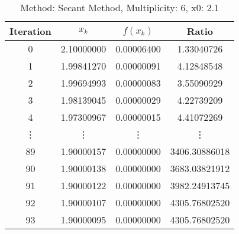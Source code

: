 \begin{table}
\centering
\caption{Method: Secant Method, Multiplicity: 6, x0: 2.1}
\label{tab:table_Secant_Method_6_2_1}
\begin{tabular}{c c c c}
\toprule
Iteration &      $x_k$ &   $f(x_k)$ &         Ratio \\
\midrule
        0 & 2.10000000 & 0.00006400 &    1.33040726 \\
        1 & 1.99841270 & 0.00000091 &    4.12848548 \\
        2 & 1.99694993 & 0.00000083 &    3.55090929 \\
        3 & 1.98139045 & 0.00000029 &    4.22739209 \\
        4 & 1.97300967 & 0.00000015 &    4.41072269 \\
   \vdots &     \vdots &     \vdots &        \vdots \\
       89 & 1.90000157 & 0.00000000 & 3406.30886018 \\
       90 & 1.90000138 & 0.00000000 & 3683.03821912 \\
       91 & 1.90000122 & 0.00000000 & 3982.24913745 \\
       92 & 1.90000107 & 0.00000000 & 4305.76802520 \\
       93 & 1.90000095 & 0.00000000 & 4305.76802520 \\
\bottomrule
\end{tabular}
\end{table}
